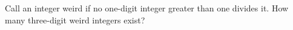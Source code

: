 Call an integer weird if no one-digit integer greater than one divides it. How many three-digit weird integers exist?
